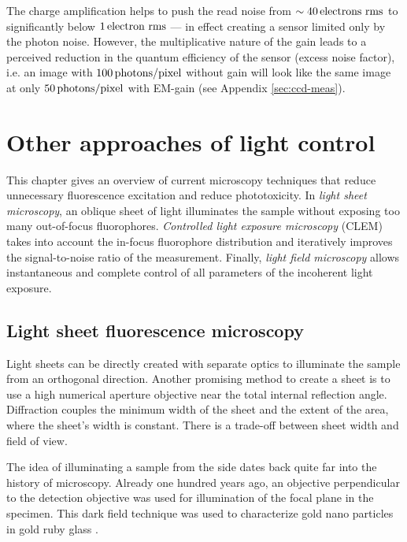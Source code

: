 The charge amplification helps to push the read noise from
$\sim\unit[40]{electrons\ rms}$ to significantly below
$\unit[1]{electron\ rms}$ --- in effect creating a sensor limited only
by the photon noise. However, the multiplicative nature of the gain
leads to a perceived reduction in the quantum efficiency of the sensor
(excess noise factor), i.e. an image with $\unit[100]{photons/pixel}$
without gain will look like the same image at only
$\unit[50]{photons/pixel}$ with EM-gain (see Appendix
\ref{sec:ccd-meas}).


\chapter{Other approaches of light control}
\label{sec:approaches}
%
\begin{summary}
  This chapter gives an overview of current microscopy techniques that
  reduce unnecessary fluorescence excitation and reduce
  phototoxicity. In \emph{light sheet microscopy}, an oblique sheet of
  light illuminates the sample without exposing too many out-of-focus
  fluorophores. \emph{Controlled light exposure microscopy} (CLEM)
  takes into account the in-focus fluorophore distribution and
  iteratively improves the signal-to-noise ratio of the measurement.
  Finally, \emph{light field microscopy} allows instantaneous and
  complete control of all parameters of the incoherent light exposure.
\end{summary}
\section{Light sheet fluorescence microscopy}
\begin{summary}
  Light sheets can be directly created with separate optics to
  illuminate the sample from an orthogonal direction. Another
  promising method to create a sheet is to use a high numerical
  aperture objective near the total internal reflection
  angle. Diffraction couples the minimum width of the sheet and the
  extent of the area, where the sheet's width is constant. There is a
  trade-off between sheet width and field of view.
\end{summary}
The idea of illuminating a sample from the side dates back quite far
into the history of microscopy. Already one hundred years ago, an
objective perpendicular to the detection objective was used for
illumination of the focal plane in the specimen. This dark field
technique was used to characterize gold nano particles in gold ruby
glass \citep{Siedentopf1903}.

